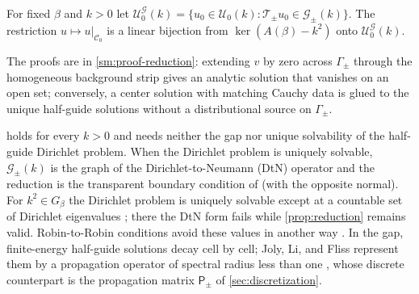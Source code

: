 \begin{proposition}\label{prop:reduction}
For fixed $\beta$ and $k>0$ let
$\mathcal U_0^{\mathcal G}(k)=\{u_0\in\mathcal U_0(k):\mathscr T_\pm u_0\in
\mathcal G_\pm(k)\}$. The restriction $u\mapsto u|_{\mathcal C_0}$ is a linear
bijection from $\ker(A(\beta)-k^2)$ onto $\mathcal U_0^{\mathcal G}(k)$.
\end{proposition}

The proofs are in \cref{sm:proof-reduction}: extending $v$ by zero across
$\Gamma_\pm$ through the homogeneous background strip gives an analytic
solution that vanishes on an open set; conversely, a center solution with
matching Cauchy data is glued to the unique half-guide solutions without a
distributional source on $\Gamma_\pm$.

 holds for every $k>0$ and needs neither the gap nor
unique solvability of the half-guide Dirichlet problem. When the Dirichlet
problem is uniquely solvable, $\mathcal G_\pm(k)$ is the graph of the
Dirichlet-to-Neumann (DtN) operator and the reduction is the transparent
boundary condition of \cite[Thm.~4.5]{Fliss2013} (with the opposite normal).
For $k^2\in G_\beta$ the Dirichlet problem is uniquely solvable except at a
countable set of Dirichlet eigenvalues \cite[Thm.~4.1]{Fliss2013}; there the DtN
form fails while \cref{prop:reduction} remains valid. Robin-to-Robin conditions
avoid these values in another way \cite{FlissKlindworthSchmidt2015}. In the gap, finite-energy half-guide
solutions decay cell by cell; Joly, Li, and Fliss represent them by a
propagation operator of spectral radius less than one \cite{JolyLiFliss2006},
whose discrete counterpart is the propagation matrix $\mathsf P_\pm$ of
\cref{sec:discretization}.

